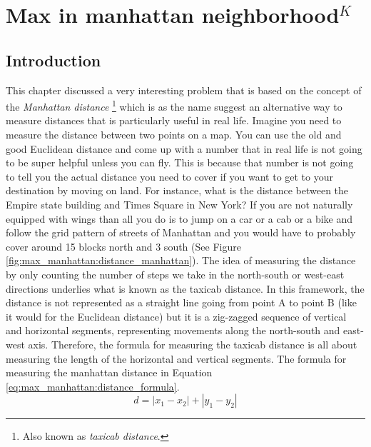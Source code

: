 %



\chapter{Max in manhattan neighborhood$^{K}$}
\label{ch:max_manhattan}
\section*{Introduction}
This chapter discussed a very interesting problem that is based on the concept of the
\textit{Manhattan distance} \footnote{Also known as \textit{taxicab distance}.} which is as the name
suggest an alternative way to measure distances that is particularly useful in real life. Imagine
you need to measure the distance between two points on a map. You can use the old and good Euclidean
distance and come up with a number that in real life is not going to be super helpful unless you can fly. This is because that number is not going to tell you the actual distance you need to
cover if you want to get to your destination by moving on land. For instance, what is the distance
between the Empire state building and Times Square in New York? If you are not naturally equipped
with wings than all you do is to jump on a car or a cab or a bike and follow the grid pattern of
streets of Manhattan and you would have to probably cover around 15 blocks north and 3 south (See
Figure \ref{fig:max_manhattan:distance_manhattan}). The idea of measuring the distance by only
counting the number of steps we take in the north-south or west-east directions underlies what is
known as the taxicab distance. In this framework, the distance is not represented as a straight line
going from point A to point B (like it would for the Euclidean distance) but it is a zig-zagged
sequence of vertical and horizontal segments, representing movements along the north-south and
east-west axis. Therefore, the formula for measuring the taxicab distance is all about measuring
the length of the horizontal and vertical segments. The formula for measuring the manhattan distance in
Equation \ref{eq:max_manhattan:distance_formula}.
\begin{equation}
    d = |x_1-x_2|+|y_1-y_2|
    \label{eq:max_manhattan:distance_formula}
\end{equation}

